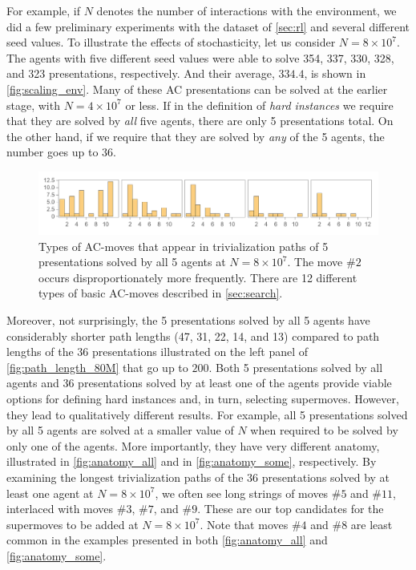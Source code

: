 For example, if $N$ denotes the number of interactions with the environment, we did a few preliminary experiments with the dataset of \autoref{sec:rl} and several different seed values. To illustrate the effects of stochasticity, let us consider $N=8 \times 10^7$. The agents with five different seed values were able to solve 354, 337, 330, 328, and 323 presentations, respectively. And their average, $334.4$, is shown in \autoref{fig:scaling_env}. Many of these AC presentations can be solved at the earlier stage, with $N=4 \times 10^7$ or less. If in the definition of \textit{hard instances} we require that they are solved by \textit{all} five agents, there are only 5 presentations total. On the other hand, if we require that they are solved by \textit{any} of the 5 agents, the number goes up to 36.

\begin{figure}[h]
	\centering
	\includegraphics[scale=0.6]{fig/anatomy_all.png}
	\caption{Types of AC-moves that appear in trivialization paths of 5 presentations solved by all 5 agents at $N=8 \times 10^7$. The move $\# 2$ occurs disproportionately more frequently. There are 12 different types of basic AC-moves described in \autoref{sec:search}.}
	\label{fig:anatomy_all}
\end{figure}

Moreover, not surprisingly, the 5 presentations solved by all 5 agents have considerably shorter path lengths (47, 31, 22, 14, and 13) compared to path lengths of the 36 presentations illustrated on the left panel of \autoref{fig:path_length_80M} that go up to $200$. Both 5 presentations solved by all agents and 36 presentations solved by at least one of the agents provide viable options for defining hard instances and, in turn, selecting supermoves. However, they lead to qualitatively different results. For example, all 5 presentations solved by all 5 agents are solved at a smaller value of $N$ when required to be solved by only one of the agents. More importantly, they have very different anatomy, illustrated in \autoref{fig:anatomy_all} and in \autoref{fig:anatomy_some}, respectively.
By examining the longest trivialization paths of the 36 presentations solved by at least one agent at $N=8 \times 10^7$, we often see long strings of moves $\# 5$ and $\# 11$, interlaced with moves $\# 3$, $\# 7$, and $\# 9$. These are our top candidates for the supermoves to be added at $N=8 \times 10^7$.
Note that moves $\# 4$ and $\# 8$ are least common in the examples presented in both \autoref{fig:anatomy_all} and \autoref{fig:anatomy_some}.

